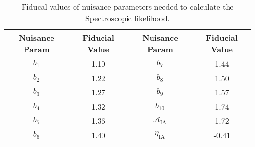 \documentclass[oneside]{book}
\begin{document}
\begin{table}
    \centering
    \begin{tabular}{c|c||c|c}
    Nuisance Param &Fiducial Value&Nuisance Param &Fiducial Value\\
    \hline
    $b_1$ & 1.10 & $b_7$ & 1.44\\  
    $b_2$ & 1.22 & $b_8$ & 1.50\\  
    $b_3$ & 1.27 & $b_9$ & 1.57\\  
    $b_4$ & 1.32 & $b_{10}$ & 1.74\\  
    $b_5$ & 1.36 & $\mathcal{A}_\mathrm{IA}$ & 1.72\\  
    $b_6$ & 1.40 & $\eta_\mathrm{IA}$ & -0.41\\  

\end{tabular}
\caption{Fiducal values of nuisance parameters needed to calculate the Spectroscopic likelihood.}
\label{tab:spectro_nuisance}
\end{table}
\end{document}
